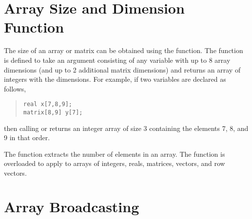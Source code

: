 \section{Array Size and Dimension Function}

The size of an array or matrix can be obtained using the 
function.  The  function is defined to take an argument
consisting of any variable with up to 8 array dimensions (and up to 2
additional matrix dimensions) and returns an array of integers with
the dimensions.  For example, if two variables are declared as follows,
\begin{quote}
\begin{Verbatim}[fontsize=\small]
real x[7,8,9];
matrix[8,9] y[7];
\end{Verbatim}
\end{quote}
%
then calling  or  returns an integer 
array of size 3 containing the elements 7, 8, and 9 in that order. 

The  function extracts the number of elements in an
array.  The function is overloaded to apply to arrays of integers,
reals, matrices, vectors, and row vectors.

\begin{description}
%
\end{description}


\section{Array Broadcasting}\label{array-broadcasting.section}

